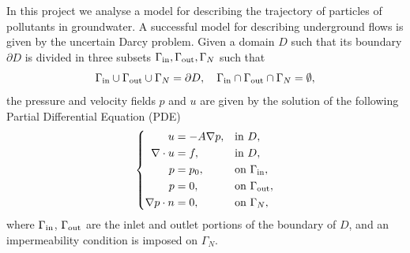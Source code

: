 In this project we analyse a model for describing the trajectory of particles of pollutants in groundwater. A successful model for describing underground flows is given by the uncertain Darcy problem. Given a domain $D$ such that its boundary $\partial D$ is divided in three subsets $\Gamma_{\rm in}, \Gamma_{\rm out}, \Gamma_N$ such that 
\begin{equation*}
	\Gamma_{\rm in} \cup \Gamma_{\rm out} \cup \Gamma_N = \partial D, \quad \Gamma_{\rm in} \cap \Gamma_{\rm out} \cap \Gamma_N = \emptyset,
\end{equation*} 
the pressure and velocity fields $p$ and $u$ are given by the solution of the following Partial Differential Equation (PDE)
\begin{equation}
	\label{eq:IntroDarcy}
	\left \{
	\begin{aligned}
		u &= -A \nabla p, && \text{in } D, \\
		\nabla\cdot u &= f, && \text{in } D, \\
		p &= p_0, && \text{on } \Gamma_{\rm in},\\
		p &= 0, && \text{on } \Gamma_{\rm out}, \\
		\nabla p \cdot n &= 0, && \text{on } \Gamma_N,
	\end{aligned} \right.
\end{equation}
where $\Gamma_{\rm in}$, $\Gamma_{\rm out}$ are the inlet and outlet portions of the boundary of $D$, and an impermeability condition is imposed on $\Gamma_N$.

